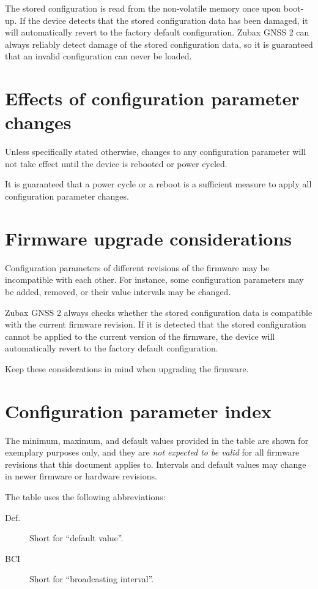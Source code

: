 \documentclass{zubaxdoc}
\begin{document}
The stored configuration is read from the non-volatile memory once upon boot-up.
If the device detects that the stored configuration data has been damaged,
it will automatically revert to the factory default configuration.
Zubax GNSS 2 can always reliably detect damage of the stored configuration data,
so it is guaranteed that an invalid configuration can never be loaded.

\section{Effects of configuration parameter changes}

Unless specifically stated otherwise, changes to any configuration parameter will not take effect until
the device is rebooted or power cycled.

It is guaranteed that a power cycle or a reboot is a sufficient measure to apply all configuration parameter
changes.

\section{Firmware upgrade considerations}

Configuration parameters of different revisions of the firmware may be incompatible with each other.
For instance, some configuration parameters may be added, removed, or their value intervals may be changed.

Zubax GNSS 2 always checks whether the stored configuration data is compatible with the current
firmware revision.
If it is detected that the stored configuration cannot be applied to the current version of the firmware,
the device will automatically revert to the factory default configuration.

Keep these considerations in mind when upgrading the firmware.

\section{Configuration parameter index}

The minimum, maximum, and default values provided in the table are shown for exemplary purposes only,
and they are \emph{not expected to be valid} for all firmware revisions that this document applies to.
Intervals and default values may change in newer firmware or hardware revisions.

The table uses the following abbreviations:
\begin{description}
\item[Def.] Short for ``default value''.
\item[BCI] Short for ``broadcasting interval''.
\end{description}
\end{document}
